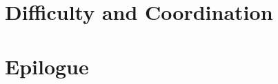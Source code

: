 \documentclass[11pt,oneside,a4paper]{book}
\theoremstyle{definition}
\theoremstyle{plain}
\theoremstyle{remark}
\begin{document}
\part{Difficulty and Coordination}








\part{Epilogue}



\appendix







\backmatter




\printindex
\end{document}
